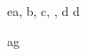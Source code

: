\begin{eqcode}{e}{a, b, c}{, , }{}
  d \in {} \lend
  d \gets {} \lend %
\end{eqcode}

\begin{eqcode}{a}{g }{}{}
  
\end{eqcode}
